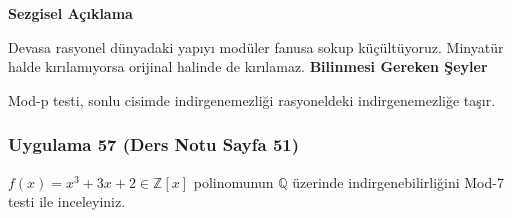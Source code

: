 \documentclass[11pt, a4paper]{article}
\newenvironment{sezgisel}{
    \vspace{0.5cm}
    \noindent\textcolor{orange!80!black}{\faLightbulb\enspace \textbf{\Large Sezgisel Açıklama}}\par\vspace{0.2cm}
    \itshape
}{}
\newenvironment{bilgi}{
    \vspace{0.5cm}
    \noindent\textcolor{red!70!black}{\faExclamationTriangle\enspace \textbf{\Large Bilinmesi Gereken Şeyler}}\par\vspace{0.2cm}
}{}
\begin{document}
\begin{sezgisel}
Devasa rasyonel dünyadaki yapıyı modüler fanusa sokup küçültüyoruz. Minyatür halde kırılamıyorsa orijinal halinde de kırılamaz.
\end{sezgisel}
\begin{bilgi}
Mod-p testi, sonlu cisimde indirgenemezliği rasyoneldeki indirgenemezliğe taşır.
\end{bilgi}

\newpage
\subsubsection{Uygulama 57 (Ders Notu Sayfa 51)}
\begin{sorubox}
$f(x)=x^3+3x+2 \in \mathbb{Z}[x]$ polinomunun $\mathbb{Q}$ üzerinde indirgenebilirliğini Mod-7 testi ile inceleyiniz.
\end{sorubox}
\end{document}
